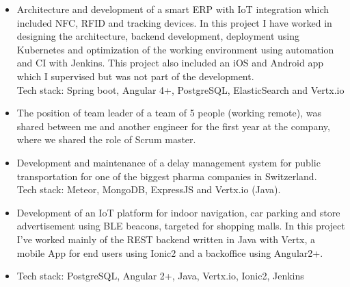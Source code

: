 \documentclass[10pt,a4paper]{altacv}
\begin{document}

\begin{fullwidth}
\makecvheader
\end{fullwidth}


\begin{itemize}
\justifying
\item Architecture and development of a smart ERP with IoT integration which
  included NFC, RFID and tracking devices. In this project I have worked in
  designing the architecture, backend development, deployment using Kubernetes
  and optimization of the working environment using automation and CI with
  Jenkins. This project also included an iOS and Android app which I supervised
  but was not part of the development.
  \\Tech stack: Spring boot, Angular 4+, PostgreSQL, ElasticSearch and Vertx.io
\item The position of team leader of a team of 5 people (working remote), was
  shared between me and another engineer for the first year at the company, where we shared the role of Scrum master.
\item Development and maintenance of a delay management system for public
  transportation for one of the biggest pharma companies in Switzerland.
  \\Tech stack: Meteor, MongoDB, ExpressJS and Vertx.io (Java).  
\end{itemize} 

\divider

\begin{itemize}
\justifying 
\item Development of an IoT platform for indoor navigation, car parking and store advertisement using BLE beacons, targeted for shopping malls.
In this project I've worked mainly of the REST backend written in Java with Vertx, a mobile App for end users using Ionic2 and a backoffice using Angular2+.  
\item Tech stack: PostgreSQL, Angular 2+, Java, Vertx.io, Ionic2, Jenkins
\end{itemize}
\end{document}
